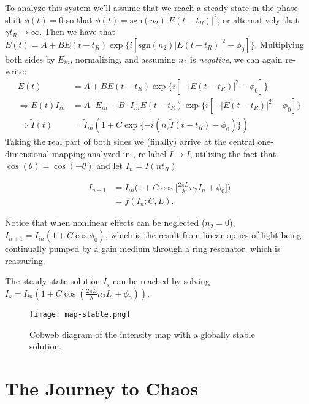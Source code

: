 \documentclass[12pt]{article}
\begin{document}
To analyze this system we'll assume that we reach a steady-state in the phase shift
$\dot{\phi}(t) = 0$ so that $\phi(t) = \text{sgn}(n_2)|E(t - t_R)|^2$, or alternatively that
$\gamma t_R \to \infty$. Then we have that
$E(t) = A + BE(t - t_R) \exp\{i[\text{sgn}(n_2) |E(t - t_R)|^2 - \phi_0]\}$. Multiplying
both sides by $E_{in}$, normalizing, and assuming $n_2$ is \textit{negative}, we can again
re-write:
\begin{align*}
  E(t) &= A + BE(t - t_R) \exp\{i[-|E(t - t_R)|^2 - \phi_0]\}\\
  \Rightarrow E(t)I_{in} &= A\cdot E_{in}  + B\cdot I_{in} E(t - t_R) \exp\{i[-|E(t-t_{R})|^2 -
                           \phi_0]\}\\
  \Rightarrow \tilde{I}(t) &= \tilde{I}_{in}(1 + C \exp\{-i(n_2\tilde{I}(t - t_R) - \phi_0)\})
\end{align*}
Taking the real part of both sides we (finally) arrive at the central one-dimensional
mapping analyzed in \cite{harrison_chaos_1986}, re-label
$\tilde{I} \to I$, utilizing the fact that $\cos(\theta) = \cos(-\theta)$ and let $I_n = I(nt_R)$

\begin{align}
  \label{eq:2}
  I_{n+1} &= I_{in}\bigg(1 + C\cos\big[\frac{2\pi L}{\lambda}n_2 I_{n} + \phi_0\big]\bigg)\\
          &= f(I_n; C, L).
\end{align}

Notice that when nonlinear effects can be neglected ($n_2 = 0$), $I_{n+1} = I_{in}(1 +
C\cos\phi_0)$, which is the result from linear optics of light being continually pumped
by a gain medium through a ring resonator, which is reassuring.

The steady-state solution $I_s$ can be reached by solving
$I_s = I_{in}(1 + C\cos(\frac{2\pi L}{\lambda}n_{2} I_s + \phi_0))$.



\begin{figure}[htbp]
  \centerline{\texttt{[image: map-stable.png]}}
  \caption[]{Cobweb diagram of the intensity map with a globally stable solution.}
\end{figure}
\section*{The Journey to Chaos}
\end{document}
